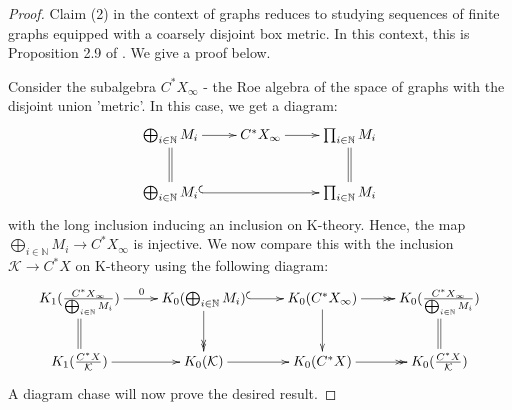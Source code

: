 \documentclass[11pt]{amsart}
\theoremstyle{plain}
\theoremstyle{definition}%
\theoremstyle{remark}%
\begin{document}
{\begin{proof}
Claim (2) in the context of graphs reduces to studying sequences of finite graphs equipped with a coarsely disjoint box metric. In this context, this is Proposition 2.9 of \cite{mypub1}. We give a proof below.

Consider the subalgebra $C^{*}X_{\infty}$ - the Roe algebra of the space of graphs with the disjoint union 'metric'. In this case, we get a diagram:
\begin{equation*}
\xymatrix{\bigoplus_{i \in \mathbb{N}} M_{i} \ar@{->}[r]\ar@{=}[d]  & C^{*}X_{\infty} \ar@{->}[r]& \prod_{i\in \mathbb{N}}M_{i}\ar@{=}[d]\\
\bigoplus_{i \in \mathbb{N}} M_{i}\ar@{^{(}->}[rr] & & \prod_{i\in \mathbb{N}}M_{i}
}
\end{equation*}
with the long inclusion inducing an inclusion on K-theory. Hence, the map $\bigoplus_{i \in \mathbb{N}} M_{i} \rightarrow C^{*}X_{\infty}$ is injective. We now compare this with the inclusion $\mathcal{K} \rightarrow C^{*}X$ on K-theory using the following diagram:
\begin{equation*}
\xymatrix{K_{1}(\frac{C^{*}X_{\infty}}{\bigoplus_{i\in\mathbb{N}}M_{i}})\ar@{->}[r]^{0}\ar@{=}[d]& K_{0}(\bigoplus_{i\in \mathbb{N}}M_{i}) \ar@{^{(}->}[r]\ar@{->>}[d] & K_{0}(C^{*}X_{\infty}) \ar@{->>}[r] \ar@{->}[d] & K_{0}(\frac{C^{*}X_{\infty}}{\bigoplus_{i\in\mathbb{N}}M_{i}})\ar@{=}[d]\\
K_{1}(\frac{C^{*}X}{\mathcal{K}})\ar@{->}[r]& K_{0}(\mathcal{K}) \ar@{->}[r] & K_{0}(C^{*}X) \ar@{->>}[r]  & K_{0}(\frac{C^{*}X}{\mathcal{K}})}
\end{equation*}
A diagram chase will now prove the desired result.
\end{proof}

}
\end{document}
